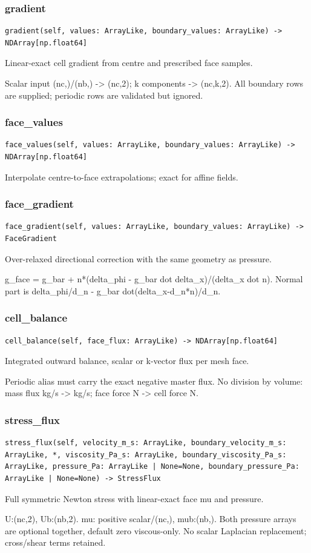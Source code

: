 \subsubsection*{gradient}
\begin{lstlisting}
gradient(self, values: ArrayLike, boundary_values: ArrayLike) -> NDArray[np.float64]
\end{lstlisting}
Linear-exact cell gradient from centre and prescribed face samples.\par Scalar input (nc,)/(nb,) -> (nc,2); k components -> (nc,k,2). All boundary rows are supplied; periodic rows are validated but ignored.
\subsubsection*{face\_values}
\begin{lstlisting}
face_values(self, values: ArrayLike, boundary_values: ArrayLike) -> NDArray[np.float64]
\end{lstlisting}
Interpolate centre-to-face extrapolations; exact for affine fields.
\subsubsection*{face\_gradient}
\begin{lstlisting}
face_gradient(self, values: ArrayLike, boundary_values: ArrayLike) -> FaceGradient
\end{lstlisting}
Over-relaxed directional correction with the same geometry as pressure.\par g\_face = g\_bar + n*(delta\_phi - g\_bar dot delta\_x)/(delta\_x dot n). Normal part is delta\_phi/d\_n - g\_bar dot(delta\_x-d\_n*n)/d\_n.
\subsubsection*{cell\_balance}
\begin{lstlisting}
cell_balance(self, face_flux: ArrayLike) -> NDArray[np.float64]
\end{lstlisting}
Integrated outward balance, scalar or k-vector flux per mesh face.\par Periodic alias must carry the exact negative master flux. No division by volume: mass flux kg/s -> kg/s; face force N -> cell force N.
\subsubsection*{stress\_flux}
\begin{lstlisting}
stress_flux(self, velocity_m_s: ArrayLike, boundary_velocity_m_s: ArrayLike, *, viscosity_Pa_s: ArrayLike, boundary_viscosity_Pa_s: ArrayLike, pressure_Pa: ArrayLike | None=None, boundary_pressure_Pa: ArrayLike | None=None) -> StressFlux
\end{lstlisting}
Full symmetric Newton stress with linear-exact face mu and pressure.\par U:(nc,2), Ub:(nb,2). mu: positive scalar/(nc,), mub:(nb,). Both pressure arrays are optional together, default zero viscous-only. No scalar Laplacian replacement; cross/shear terms retained.
